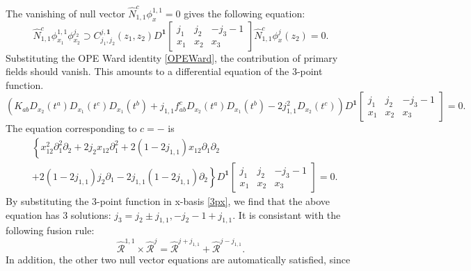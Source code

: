 \documentclass[10pt,a4paper]{article}
\theoremstyle{definition}
\theoremstyle{plain}
\theoremstyle{remark}
\numberwithin{equation}{section}
\begin{document}
The vanishing of null vector $\hat{N}^{c}_{1,1} \phi^{1,1}_{x} = 0$ gives the following equation:
\begin{equation}
    \hat{N}^{c}_{1,1} \phi^{1,1}_{x_{1}} \phi^{j_{2}}_{x_{2}} \supset C^{j,\mathbf{1}}_{j_{1},j_{2}}(z_{1},z_{2}) D^{\mathbf{1}} \left[\begin{array}{ccc}
j_{1} & j_2 & -j_3-1 \\
x_1 & x_2 & x_3
\end{array} \right] \hat{N}^{c}_{1,1} \phi^{j}_{x}(z_{2}) = 0.
\end{equation}
Substituting the OPE Ward identity \ref{OPEWard}, the contribution of primary fields should vanish. 
This amounts to a differential equation of the 3-point function.
\begin{equation}
    \left( K_{a b} D_{x_2}\left(t^a\right) D_{x_1}\left(t^c\right) D_{x_1}\left(t^b\right)+ j_{1,1} f_{a b}^c D_{x_2}\left(t^a\right) D_{x_1}\left(t^b\right) 
    - 2 j_{1,1}^2 D_{x_2}\left(t^c\right) \right) D^{\mathbf{1}} \left[\begin{array}{ccc}
    j_{1} & j_2 & -j_3-1 \\
    x_1 & x_2 & x_3
    \end{array} \right] = 0.
\end{equation}
The equation corresponding to $c = -$ is
\begin{equation}
    \begin{aligned}
        &\left\{ x_{12}^2 \partial_{1}^{2} \partial_{2} + 2 j_{2} x_{12} \partial_{1}^{2} + 2 (1-2j_{1,1})x_{12} \partial_{1}\partial_{2} \right. \\
        &\left. + 2 (1-2j_{1,1})j_{2} \partial_{1} -2j_{1,1}(1-2j_{1,1}) \partial_{2} \right\} D^{\mathbf{1}} \left[\begin{array}{ccc}
    j_{1} & j_2 & -j_3-1 \\
    x_1 & x_2 & x_3
    \end{array} \right] = 0 .
    \end{aligned}
\end{equation}
By substituting the 3-point function in x-basis \ref{3px}, we find that the above equation has 3 solutions: 
$j_{3} = j_{2} \pm j_{1,1}, -j_{2} - 1 + j_{1,1}$. It is consistant with the following fusion rule:
\begin{equation}
    \hat{\mathcal{R}}^{1,1} \times \hat{\mathcal{R}}^{j} = \hat{\mathcal{R}}^{j+j_{1,1}} + \hat{\mathcal{R}}^{j-j_{1,1}}.
\end{equation}
In addition, the other two null vector equations are automatically satisfied, since 
\end{document}
